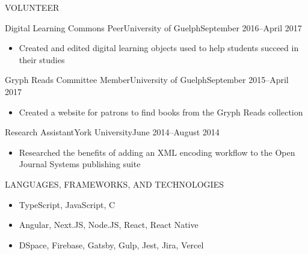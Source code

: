 \documentclass[]{mcdowellcv}
\begin{document}
  \begin{cvsection}{VOLUNTEER}
    \begin{cvsubsection}{Digital Learning Commons Peer}{University of Guelph}{September 2016--April 2017}
   \begin{itemize}
     \item Created and edited digital learning objects used to help students succeed in their studies
   \end{itemize}
 \end{cvsubsection}

     \begin{cvsubsection}{Gryph Reads Committee Member}{University of Guelph}{September 2015--April 2017}
   \begin{itemize}
     \item Created a website for patrons to find books from the Gryph Reads collection
   \end{itemize}
 \end{cvsubsection}


     \begin{cvsubsection}{Research Assistant}{York University}{June 2014--August 2014}
   \begin{itemize}
     \item Researched the benefits of adding an XML encoding workflow to the Open Journal Systems publishing suite
   \end{itemize}
 \end{cvsubsection}
\end{cvsection}

	\begin{cvsection}{LANGUAGES, FRAMEWORKS, AND TECHNOLOGIES}
		\begin{cvsubsection}{}{}{}	
			\begin{itemize}
				\item TypeScript, JavaScript, C
				\item Angular, Next.JS, Node.JS, React, React Native
				\item DSpace, Firebase, Gatsby, Gulp, Jest, Jira, Vercel
			\end{itemize}
		\end{cvsubsection}
	\end{cvsection}
	
\end{document}

